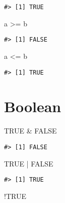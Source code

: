 \documentclass[
]{book}
\newenvironment{Shaded}{\begin{snugshade}}{\end{snugshade}}
\newcommand{\ConstantTok}[1]{\textcolor[rgb]{0.00,0.00,0.00}{#1}}
\newcommand{\NormalTok}[1]{#1}
\newcommand{\SpecialCharTok}[1]{\textcolor[rgb]{0.00,0.00,0.00}{#1}}
\begin{document}
\begin{verbatim}
#> [1] TRUE
\end{verbatim}

\begin{Shaded}
\begin{Highlighting}[]
\NormalTok{a }\SpecialCharTok{\textgreater{}=}\NormalTok{ b}
\end{Highlighting}
\end{Shaded}

\begin{verbatim}
#> [1] FALSE
\end{verbatim}

\begin{Shaded}
\begin{Highlighting}[]
\NormalTok{a }\SpecialCharTok{\textless{}=}\NormalTok{ b}
\end{Highlighting}
\end{Shaded}

\begin{verbatim}
#> [1] TRUE
\end{verbatim}

\hypertarget{boolean}{%
\section{Boolean}\label{boolean}}

\begin{Shaded}
\begin{Highlighting}[]
\ConstantTok{TRUE} \SpecialCharTok{\&} \ConstantTok{FALSE}
\end{Highlighting}
\end{Shaded}

\begin{verbatim}
#> [1] FALSE
\end{verbatim}

\begin{Shaded}
\begin{Highlighting}[]
\ConstantTok{TRUE} \SpecialCharTok{|} \ConstantTok{FALSE}
\end{Highlighting}
\end{Shaded}

\begin{verbatim}
#> [1] TRUE
\end{verbatim}

\begin{Shaded}
\begin{Highlighting}[]
\SpecialCharTok{!}\ConstantTok{TRUE}
\end{Highlighting}
\end{Shaded}
\end{document}
